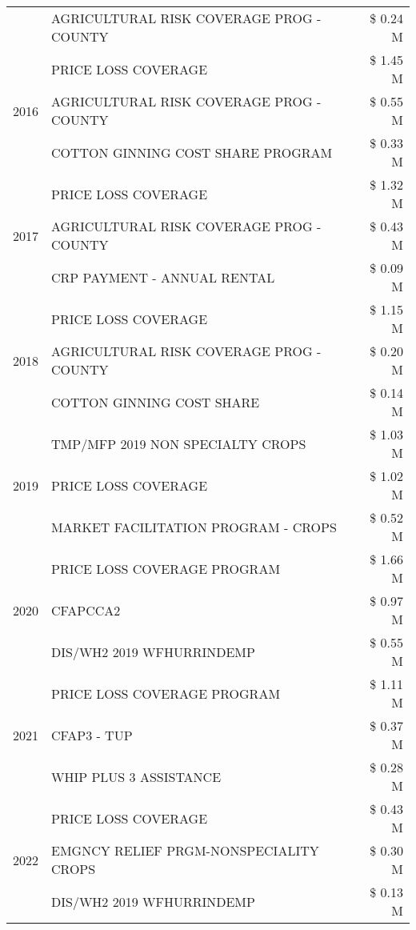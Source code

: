 \begin{tabular}{llr}
 & AGRICULTURAL RISK COVERAGE PROG - COUNTY & \$ 0.24 M \\
\cline{1-3}
\multirow[t]{3}{*}{2016} & PRICE LOSS COVERAGE & \$ 1.45 M \\
 & AGRICULTURAL RISK COVERAGE PROG - COUNTY & \$ 0.55 M \\
 & COTTON GINNING COST SHARE PROGRAM & \$ 0.33 M \\
\cline{1-3}
\multirow[t]{3}{*}{2017} & PRICE LOSS COVERAGE & \$ 1.32 M \\
 & AGRICULTURAL RISK COVERAGE PROG - COUNTY & \$ 0.43 M \\
 & CRP PAYMENT - ANNUAL RENTAL & \$ 0.09 M \\
\cline{1-3}
\multirow[t]{3}{*}{2018} & PRICE LOSS COVERAGE & \$ 1.15 M \\
 & AGRICULTURAL RISK COVERAGE PROG - COUNTY & \$ 0.20 M \\
 & COTTON GINNING COST SHARE & \$ 0.14 M \\
\cline{1-3}
\multirow[t]{3}{*}{2019} & TMP/MFP 2019 NON SPECIALTY CROPS & \$ 1.03 M \\
 & PRICE LOSS COVERAGE & \$ 1.02 M \\
 & MARKET FACILITATION PROGRAM - CROPS & \$ 0.52 M \\
\cline{1-3}
\multirow[t]{3}{*}{2020} & PRICE LOSS COVERAGE PROGRAM & \$ 1.66 M \\
 & CFAPCCA2 & \$ 0.97 M \\
 & DIS/WH2 2019 WFHURRINDEMP & \$ 0.55 M \\
\cline{1-3}
\multirow[t]{3}{*}{2021} & PRICE LOSS COVERAGE PROGRAM & \$ 1.11 M \\
 & CFAP3 - TUP & \$ 0.37 M \\
 & WHIP PLUS 3 ASSISTANCE & \$ 0.28 M \\
\cline{1-3}
\multirow[t]{3}{*}{2022} & PRICE LOSS COVERAGE & \$ 0.43 M \\
 & EMGNCY RELIEF PRGM-NONSPECIALITY CROPS & \$ 0.30 M \\
 & DIS/WH2 2019 WFHURRINDEMP & \$ 0.13 M \\
\cline{1-3}
\bottomrule
\end{tabular}
